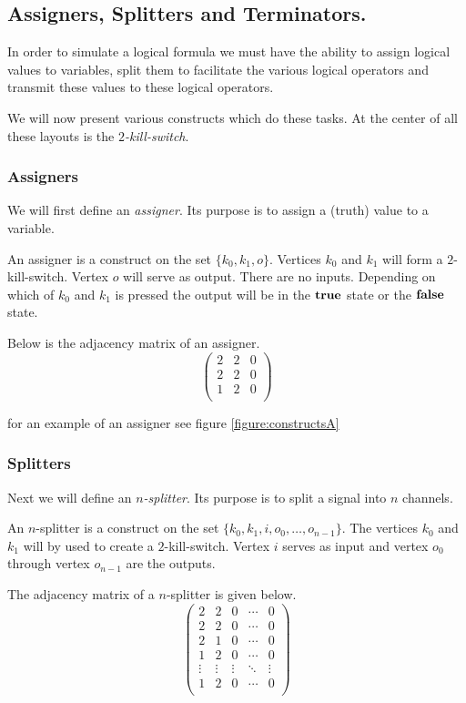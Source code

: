 \subsection{Assigners, Splitters and Terminators.}

In order to simulate a logical formula we must have the ability to
assign logical values to variables, split them to facilitate the various
logical operators and transmit these values to these logical operators.

We will now present various constructs which do these tasks. At the
center of all these layouts is the \emph{$2$-kill-switch}.

\subsubsection{Assigners}

We will first define an \emph{assigner}. Its purpose is to assign a (truth) 
value to a variable.

An assigner is a construct on the set $\{k_{0},k_{1},o\}$. Vertices $k_{0}$
and $k_{1}$ will form a $2$-kill-switch. Vertex $o$ will serve as
output. There are no inputs. Depending on which of $k_{0}$ and $k_{1}$ is 
pressed the output  will be in the $\text{\bf true}$ state or the ${\text{\bf false}}$ state.

Below is the adjacency matrix of an assigner.
\[
	\left(
	\begin{array}{ccc}
		2 & 2 & 0 \\
		2 & 2 & 0 \\
		1 & 2 & 0 \\
	\end{array}
	\right)
\]

for an example of an assigner see figure \ref{figure:constructsA}

\subsubsection{Splitters}

Next we will define an \emph{$n$-splitter}. Its purpose is to split a signal
into $n$ channels.

An $n$-splitter is a construct on the set 
$\{k_{0},k_{1},i,o_{0},\ldots,o_{n-1}\}$. The vertices
$k_{0}$ and $k_{1}$ will by used to create a $2$-kill-switch. Vertex $i$
serves as input and vertex $o_{0}$ through vertex $o_{n-1}$ are the
outputs.

The adjacency matrix of a $n$-splitter is given below.
\[
	\left(
	\begin{array}{ccccc}
		2 & 2 & 0 & \cdots & 0 \\
		2 & 2 & 0 & \cdots & 0 \\
		2 & 1 & 0 & \cdots & 0 \\
		1 & 2 & 0 & \cdots & 0 \\
		\vdots & \vdots & \vdots & \ddots & \vdots \\
		1 & 2 & 0 & \cdots & 0 \\
	\end{array}
	\right)
\]

